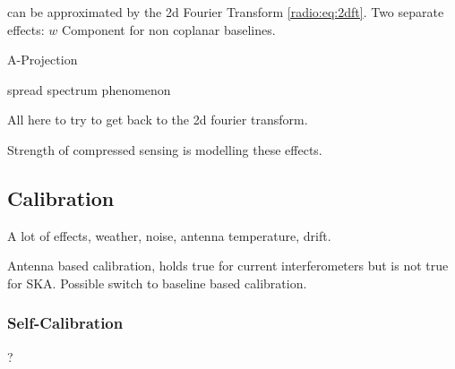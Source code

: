  can be approximated by the 2d Fourier Transform \eqref{radio:eq:2dft}. Two separate effects: $w$ Component for non coplanar baselines.



A-Projection \cite{tasse2013applying}

spread spectrum phenomenon

All here to try to get back to the 2d fourier transform. 





Strength of compressed sensing is modelling these effects.

\subsection{Calibration}
A lot of effects, weather, noise, antenna temperature, drift.

Antenna based calibration, holds true for current interferometers but is not true for SKA. Possible switch to baseline based calibration.

\subsubsection{Self-Calibration}
?